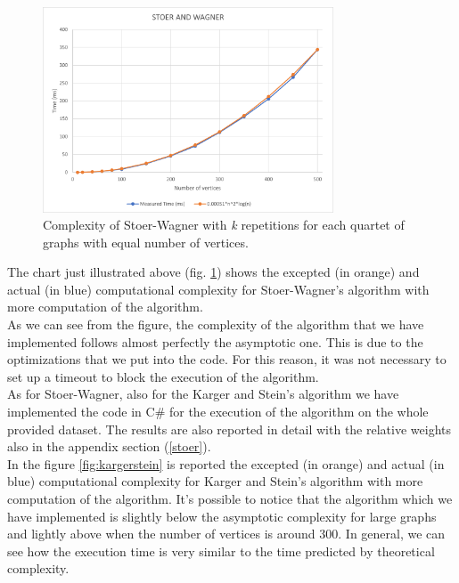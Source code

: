 \begin{figure}[H]
	\centering
	\includegraphics[width=0.77\textwidth]{./img/Stoer_Wagner}
	\caption{Complexity of Stoer-Wagner with \textit{k} repetitions for each quartet of graphs with equal number of vertices.}
	\label{fig:stoerwagner}
\end{figure}
\noindent
The chart just illustrated above (fig. \ref{fig:stoerwagner}) shows the excepted (in orange) and actual (in blue) computational complexity for Stoer-Wagner's algorithm with more computation of the algorithm.\\ \noindent
As we can see from the figure, the complexity of the algorithm that we have implemented follows almost perfectly the asymptotic one. This is due to the optimizations that we put into the code. For this reason, it was not necessary to set up a timeout to block the execution of the algorithm.\\ \noindent
As for Stoer-Wagner, also for the Karger and Stein's algorithm we have implemented the code in C\# for the execution of the algorithm on the whole provided dataset. The results are also reported in detail with the relative weights also in the appendix section (\ref{stoer}).\\ \noindent
In the figure \ref{fig:kargerstein} is reported the excepted (in orange) and actual (in blue) computational complexity for Karger and Stein's algorithm with more computation of the algorithm. It's possible to notice that the algorithm which we have implemented is slightly below the asymptotic complexity for large graphs and lightly above when the number of vertices is around 300. In general, we can see how the execution time is very similar to the time predicted by theoretical complexity.

